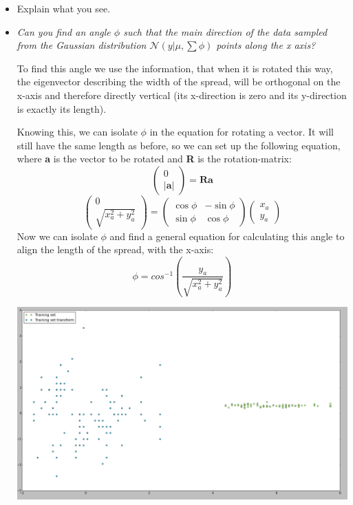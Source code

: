 \documentclass[12pt, a4paper]{article}
\begin{document}
\begin{itemize}
\item Explain what you see.
\item \textit{Can you find an angle $\phi$ such that the main direction of the data sampled from the Gaussian distribution $\mathcal{N}(y|\mu, \sum \phi )$ points along the x axis?}

To find this angle we use the information, that when it is rotated this way, the eigenvector describing the width of the spread, will be orthogonal on the x-axis and therefore directly vertical (its x-direction is zero and its y-direction is exactly its length).

Knowing this, we can isolate $\phi$ in the equation for rotating a vector. It will still have the same length as before, so we can set up the following equation, where \textbf{a} is the vector to be rotated and \textbf{R} is the rotation-matrix:
\begin{equation*}
\left( \begin{array}{c}
0 \\
|\textbf{a}| \end{array} \right)
=
\textbf{R}\textbf{a}
\end{equation*}
\begin{equation*}
\left( \begin{array}{c}
0 \\
\sqrt{x_a^2+y_a^2} 
\end{array} \right)
=
\left( \begin{array}{cc}
\cos \phi & -\sin \phi \\
\sin \phi & \cos \phi \end{array} \right)
\left( \begin{array}{c}
x_a \\
y_a \end{array} \right)
\end{equation*} 
Now we can isolate $\phi$ and find a general equation for calculating this angle to align the length of the spread, with the x-axis:
\begin{equation*}
\phi = cos^{-1}\left(\dfrac{y_a}{\sqrt{x_a^2+y_a^2}}\right)
\end{equation*} 

\includegraphics[width=\textwidth]{8.png}

\end{itemize}
\end{document}
